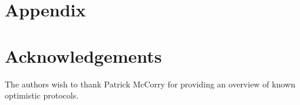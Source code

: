 






\clearpage
\appendix
\section*{Appendix}

\section*{Acknowledgements}
The authors wish to thank Patrick McCorry for providing an overview of known optimistic protocols.
